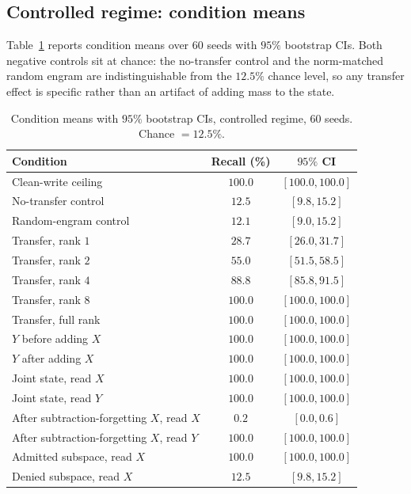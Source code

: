 \documentclass[11pt]{article}
\theoremstyle{definition}
\begin{document}
\subsection{Controlled regime: condition means}

Table~\ref{tab:means} reports condition means over $60$ seeds with $95\%$ bootstrap CIs. Both negative controls sit at chance: the no-transfer control and the norm-matched random engram are indistinguishable from the $12.5\%$ chance level, so any transfer effect is specific rather than an artifact of adding mass to the state.

\begin{table}[h]
\centering
\caption{Condition means with $95\%$ bootstrap CIs, controlled regime, $60$ seeds. Chance $=12.5\%$.}
\label{tab:means}
\begin{tabular}{lcc}
\toprule
Condition & Recall (\%) & $95\%$ CI \\
\midrule
Clean-write ceiling & $100.0$ & $[100.0,100.0]$ \\
No-transfer control & $12.5$ & $[9.8,15.2]$ \\
Random-engram control & $12.1$ & $[9.0,15.2]$ \\
\midrule
Transfer, rank $1$ & $28.7$ & $[26.0,31.7]$ \\
Transfer, rank $2$ & $55.0$ & $[51.5,58.5]$ \\
Transfer, rank $4$ & $88.8$ & $[85.8,91.5]$ \\
Transfer, rank $8$ & $100.0$ & $[100.0,100.0]$ \\
Transfer, full rank & $100.0$ & $[100.0,100.0]$ \\
\midrule
$Y$ before adding $X$ & $100.0$ & $[100.0,100.0]$ \\
$Y$ after adding $X$ & $100.0$ & $[100.0,100.0]$ \\
Joint state, read $X$ & $100.0$ & $[100.0,100.0]$ \\
Joint state, read $Y$ & $100.0$ & $[100.0,100.0]$ \\
After subtraction-forgetting $X$, read $X$ & $0.2$ & $[0.0,0.6]$ \\
After subtraction-forgetting $X$, read $Y$ & $100.0$ & $[100.0,100.0]$ \\
\midrule
Admitted subspace, read $X$ & $100.0$ & $[100.0,100.0]$ \\
Denied subspace, read $X$ & $12.5$ & $[9.8,15.2]$ \\
\bottomrule
\end{tabular}
\end{table}
\end{document}
